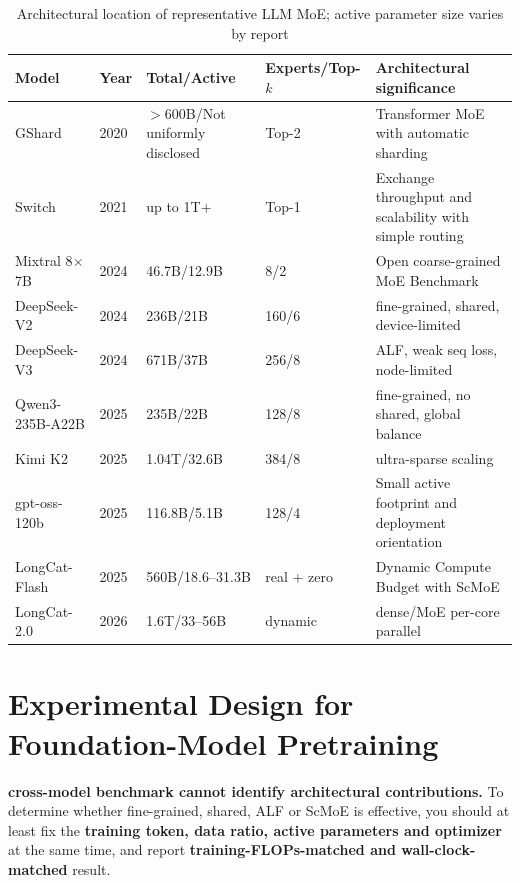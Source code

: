 \documentclass[10pt,a4paper,fontset=none]{ctexart}
\newcommand{\term}[1]{\textbf{#1}}
\begin{document}
\begin{table}[htbp]
\centering
\caption{Architectural location of representative LLM MoE; active parameter size varies by report}
\label{en:tab:models}
\scriptsize
\begin{tabularx}{\textwidth}{p{}C{15mm}C{25mm}C{22mm}Y}
\toprule
Model & Year & Total/Active & Experts/Top-$k$ & Architectural significance \\
\midrule
GShard & 2020 & $>$600B/Not uniformly disclosed & Top-2 & Transformer MoE with automatic sharding \\
Switch & 2021 & up to 1T+ & Top-1 & Exchange throughput and scalability with simple routing \\
Mixtral 8$\times$7B & 2024 & 46.7B/12.9B & 8/2 & Open coarse-grained MoE Benchmark \\
DeepSeek-V2 & 2024 & 236B/21B & 160/6 & fine-grained, shared, device-limited \\
DeepSeek-V3 & 2024 & 671B/37B & 256/8 & ALF, weak seq loss, node-limited \\
Qwen3-235B-A22B & 2025 & 235B/22B & 128/8 & fine-grained, no shared, global balance \\
Kimi K2 & 2025 & 1.04T/32.6B & 384/8 & ultra-sparse scaling \\
gpt-oss-120b & 2025 & 116.8B/5.1B & 128/4 & Small active footprint and deployment orientation \\
LongCat-Flash & 2025 & 560B/18.6--31.3B & real + zero & Dynamic Compute Budget with ScMoE \\
LongCat-2.0 & 2026 & 1.6T/33--56B & dynamic & dense/MoE per-core parallel \\
\bottomrule
\end{tabularx}
\end{table}

\section{Experimental Design for Foundation-Model Pretraining}

\term{ cross-model benchmark cannot identify architectural contributions. } To determine whether fine-grained, shared, ALF or ScMoE is effective, you should at least fix the \textbf{ training token, data ratio, active parameters and optimizer } at the same time, and report \textbf{training-FLOPs-matched and wall-clock-matched} result.
\end{document}
